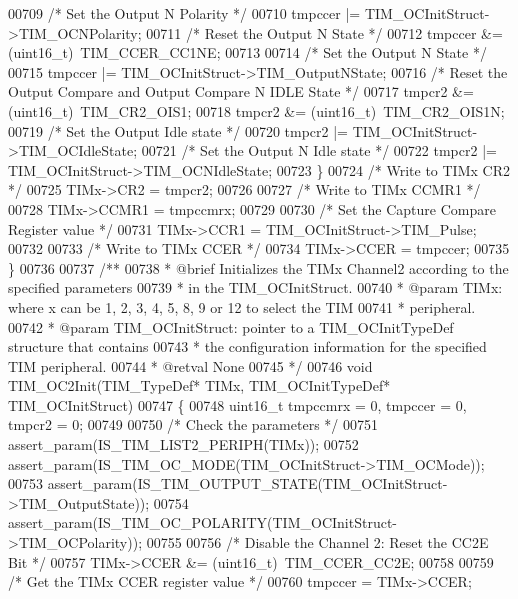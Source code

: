 \begin{DoxyCode}
00709     \textcolor{comment}{/* Set the Output N Polarity */}
00710     tmpccer |= TIM\_OCInitStruct->TIM_OCNPolarity;
00711     \textcolor{comment}{/* Reset the Output N State */}
00712     tmpccer &= (uint16\_t)~TIM_CCER_CC1NE;
00713 
00714     \textcolor{comment}{/* Set the Output N State */}
00715     tmpccer |= TIM\_OCInitStruct->TIM_OutputNState;
00716     \textcolor{comment}{/* Reset the Output Compare and Output Compare N IDLE State */}
00717     tmpcr2 &= (uint16\_t)~TIM_CR2_OIS1;
00718     tmpcr2 &= (uint16\_t)~TIM_CR2_OIS1N;
00719     \textcolor{comment}{/* Set the Output Idle state */}
00720     tmpcr2 |= TIM\_OCInitStruct->TIM_OCIdleState;
00721     \textcolor{comment}{/* Set the Output N Idle state */}
00722     tmpcr2 |= TIM\_OCInitStruct->TIM_OCNIdleState;
00723   \}
00724   \textcolor{comment}{/* Write to TIMx CR2 */}
00725   TIMx->CR2 = tmpcr2;
00726 
00727   \textcolor{comment}{/* Write to TIMx CCMR1 */}
00728   TIMx->CCMR1 = tmpccmrx;
00729 
00730   \textcolor{comment}{/* Set the Capture Compare Register value */}
00731   TIMx->CCR1 = TIM\_OCInitStruct->TIM\_Pulse;
00732 
00733   \textcolor{comment}{/* Write to TIMx CCER */}
00734   TIMx->CCER = tmpccer;
00735 \}
00736 
00737 \textcolor{comment}{/**}
00738 \textcolor{comment}{  * @brief  Initializes the TIMx Channel2 according to the specified parameters }
00739 \textcolor{comment}{  *         in the TIM\_OCInitStruct.}
00740 \textcolor{comment}{  * @param  TIMx: where x can be 1, 2, 3, 4, 5, 8, 9 or 12 to select the TIM }
00741 \textcolor{comment}{  *         peripheral.}
00742 \textcolor{comment}{  * @param  TIM\_OCInitStruct: pointer to a TIM\_OCInitTypeDef structure that contains}
00743 \textcolor{comment}{  *         the configuration information for the specified TIM peripheral.}
00744 \textcolor{comment}{  * @retval None}
00745 \textcolor{comment}{  */}
00746 \textcolor{keywordtype}{void} TIM_OC2Init(TIM\_TypeDef* TIMx, TIM\_OCInitTypeDef* TIM\_OCInitStruct)
00747 \{
00748   uint16\_t tmpccmrx = 0, tmpccer = 0, tmpcr2 = 0;
00749 
00750   \textcolor{comment}{/* Check the parameters */}
00751   assert_param(IS\_TIM\_LIST2\_PERIPH(TIMx));
00752   assert_param(IS\_TIM\_OC\_MODE(TIM\_OCInitStruct->TIM\_OCMode));
00753   assert_param(IS\_TIM\_OUTPUT\_STATE(TIM\_OCInitStruct->TIM\_OutputState));
00754   assert_param(IS\_TIM\_OC\_POLARITY(TIM\_OCInitStruct->TIM\_OCPolarity));
00755 
00756   \textcolor{comment}{/* Disable the Channel 2: Reset the CC2E Bit */}
00757   TIMx->CCER &= (uint16\_t)~TIM_CCER_CC2E;
00758 
00759   \textcolor{comment}{/* Get the TIMx CCER register value */}
00760   tmpccer = TIMx->CCER;

\end{DoxyCode}

